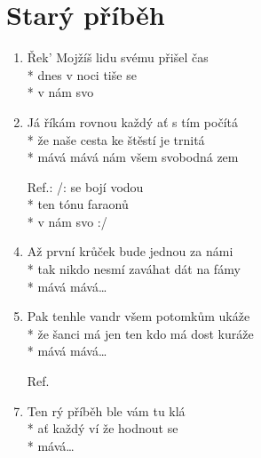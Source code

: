 \section{Starý příběh}
\begin{enumerate}
\item Řek'  Mojžíš lidu svému přišel čas \\*
dnes v noci tiše  se   \\*
v nám  svo 
\item Já říkám rovnou každý ať s tím počítá \\*
že naše cesta ke štěstí je trnitá \\*
mává mává nám všem svobodná zem 
\item[Ref.:] /:  se bojí vodou  \\*
ten  tónu faraonů   \\*
v nám  svo   :/
\item Až první krůček bude jednou za námi \\*
tak nikdo nesmí zaváhat dát na fámy \\*
mává mává… 
\item Pak tenhle vandr všem potomkům ukáže \\*
že šanci má jen ten kdo má dost kuráže \\*
mává mává… 
\item[Ref.] 
\item Ten rý příběh ble vám tu klá \\*
ať každý ví že hodnout se   \\*
 mává… 
\end{enumerate}
